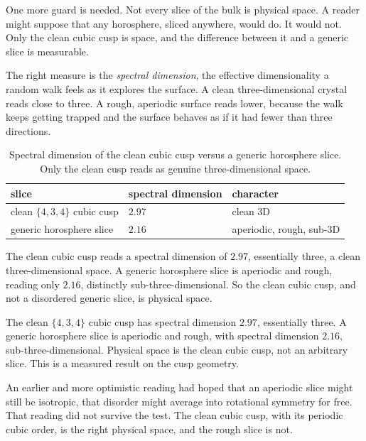 One more guard is needed. Not every slice of the bulk is physical space. A reader might suppose that any horosphere, sliced anywhere, would do. It would not. Only the clean cubic cusp is space, and the difference between it and a generic slice is measurable.

The right measure is the \emph{spectral dimension}, the effective dimensionality a random walk feels as it explores the surface. A clean three-dimensional crystal reads close to three. A rough, aperiodic surface reads lower, because the walk keeps getting trapped and the surface behaves as if it had fewer than three directions.

\begin{table}[ht]
\centering
\begin{tabular}{@{}lll@{}}
\toprule
slice & spectral dimension & character \\
\midrule
clean $\{4,3,4\}$ cubic cusp & $2.97$ & clean 3D \\
generic horosphere slice & $2.16$ & aperiodic, rough, sub-3D \\
\bottomrule
\end{tabular}
\caption{Spectral dimension of the clean cubic cusp versus a generic horosphere slice. Only the clean cusp reads as genuine three-dimensional space.}
\label{tab:spectral-dimension}
\end{table}

The clean cubic cusp reads a spectral dimension of $2.97$, essentially three, a clean three-dimensional space. A generic horosphere slice is aperiodic and rough, reading only $2.16$, distinctly sub-three-dimensional. So the clean cubic cusp, and not a disordered generic slice, is physical space.

\begin{result}
The clean $\{4,3,4\}$ cubic cusp has spectral dimension $2.97$, essentially three. A generic horosphere slice is aperiodic and rough, with spectral dimension $2.16$, sub-three-dimensional. Physical space is the clean cubic cusp, not an arbitrary slice. This is a measured result on the cusp geometry.
\end{result}

An earlier and more optimistic reading had hoped that an aperiodic slice might still be isotropic, that disorder might average into rotational symmetry for free. That reading did not survive the test. The clean cubic cusp, with its periodic cubic order, is the right physical space, and the rough slice is not.


